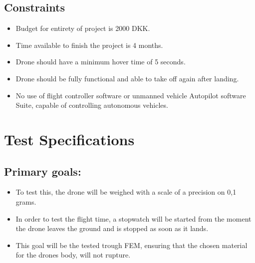 \documentclass[a4paper,11pt]{article}
\begin{document}
 
\subsection{Constraints}

\begin{itemize}
    \item 
    Budget for entirety of project is 2000 DKK.  
    \item
    Time available to finish the project is 4 months.
    \item
    Drone should have a minimum hover time of 5 seconds. 
    \item
    Drone should be fully functional and able to take off again after landing.
    \item
    No use of flight controller software or unmanned vehicle Autopilot software Suite, capable of controlling autonomous vehicles. 
\end{itemize}
 

\section {Test Specifications} 
\subsection{Primary goals:}
\begin{itemize}
    \item
    To test this, the drone will be weighed with a scale of a precision on 0,1 grams.
    \item  
    In order to test the flight time, a stopwatch will be started from the moment the drone leaves the ground and is stopped as soon as it lands.
    \item
    This goal will be the tested trough FEM, ensuring that the chosen material for the drones body, will not rupture.
\end{itemize}
  
\end{document}
